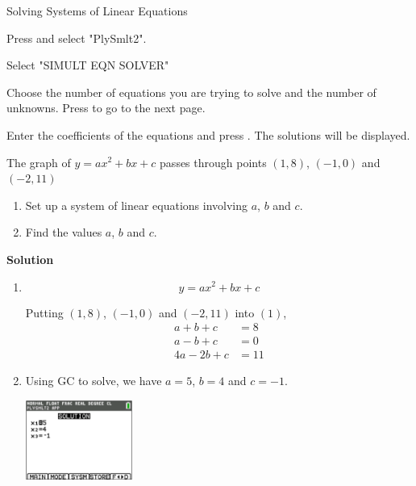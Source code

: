 \documentclass[11pt,a4paper]{book}
\begin{document}
\begin{GC}{Solving Systems of Linear Equations}
\begin{steps}
\item Press  and select "PlySmlt2".
\item Select "SIMULT EQN SOLVER"
\item Choose the number of equations you are trying to solve and the number of unknowns. Press  to go to the next page.
\item Enter the coefficients of the equations and press . The solutions will be displayed.
\end{steps}
\end{GC}

\begin{example}{}

The graph of $y=ax^{2}+bx+c$ passes through points $\left(1,8\right)$,
$\left(-1,0\right)$ and $\left(-2,11\right)$

\begin{enumerate}[label=(\alph*)]

\item Set up a system of linear equations involving $a$, $b$ and
$c$.

\item Find the values $a$, $b$ and $c$.

\end{enumerate}

\textbf{Solution}

\begin{enumerate}[label=(\alph*)]

\item
\[
y=ax^{2}+bx+c\tag{1}
\]

Putting $\left(1,8\right)$, $\left(-1,0\right)$ and $\left(-2,11\right)$
into $\left(1\right)$,
\begin{align*}
a+b+c & =8\\
a-b+c & =0\\
4a-2b+c & =11
\end{align*}

\item Using GC to solve, we have $a=5$, $b=4$ and $c=-1$.

\begin{center}
\includegraphics[width=3.5cm]{lib/GC Screenshots/LinearEquationsA.png}
\end{center}

\end{enumerate}

\end{example}
\end{document}
